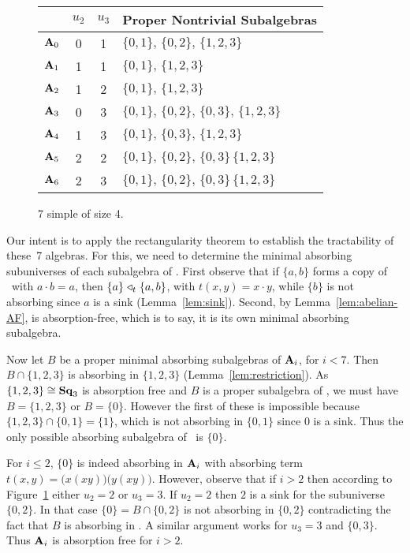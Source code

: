 \begin{figure}
\centering
\begin{tabular}{l|cc|l}
&$u_2$&$u_3$&Proper Nontrivial Subalgebras\\
\hline
$\mathbf{A}_0$&0&1&$\{0,1\},\, \{0,2\},\, \{1,2,3\}$\\
$\mathbf{A}_1$&1&1&$\{0,1\},\, \{1,2,3\}$\\
$\mathbf{A}_2$&1&2&$\{0,1\},\, \{1,2,3\}$\\
$\mathbf{A}_3$&0&3&$\{0,1\},\, \{0,2\},\, \{0,3\},\, \{1,2,3\}$\\
$\mathbf{A}_4$&1&3&$\{0,1\},\, \{0,3\},\, \{1,2,3\}$\\
$\mathbf{A}_5$&2&2&$\{0,1\},\, \{0,2\},\, \{0,3\}\, \{1,2,3\}$\\
$\mathbf{A}_6$&2&3&$\{0,1\},\, \{0,2\},\, \{0,3\}\, \{1,2,3\}$
\end{tabular}
 \caption{7 simple \cibs of size 4.}\label{fig:simple7}
 \end{figure}
 
Our intent is to apply the rectangularity theorem to establish the tractability of these~7 algebras. For this, we need to determine the minimal absorbing subuniverses of each subalgebra of \bA. First observe that if $\{a,b\}$ forms a copy of \slt\ with $a\cdot b =a$, then $\{a\} \mathrel{\triangleleft}_t \{a,b\}$, with $t(x,y)=x\cdot y$, while $\{b\}$ is not absorbing since $a$ is a sink (Lemma~\ref{lem:sink}). Second, by Lemma~\ref{lem:abelian-AF},  is absorption-free, which is to say, it is its own minimal absorbing subalgebra. 

 Now let $B$ be a proper minimal absorbing subalgebras of $\mathbf{A}_i$, for $i<7$. Then $B\cap \{1,2,3\}$ is absorbing in $\{1,2,3\}$ (Lemma~\ref{lem:restriction}). As $\{1,2,3\}\cong \mathbf{Sq}_{3}$ is absorption free and $B$ is a proper subalgebra of \bA, we must have $B=\{1,2,3\}$ or $B=\{0\}$. However the first of these is impossible because $\{1,2,3\} \cap \{0,1\} = \{1\}$, which is not absorbing in $\{0,1\}$ since $0$ is a sink. Thus the only possible absorbing subalgebra of \bA\ is $\{0\}$. 
 
 For $i\leq 2$, $\{0\}$ is indeed absorbing in $\mathbf{A}_i$ with absorbing term $t(x,y)=\bigl(x(xy)\bigr)\bigl(y(xy)\bigr)$. However, observe that if $i>2$ then according to Figure~\ref{fig:simple7} either $u_2=2$ or $u_3=3$. If $u_2=2$ then $2$ is a sink for the subuniverse $\{0,2\}$. In that case $\{0\}= B\cap \{0,2\}$ is not absorbing in $\{0,2\}$ contradicting the fact that $B$ is absorbing in \bA. A similar argument works for $u_3=3$ and $\{0,3\}$. Thus $\mathbf{A}_i$ is absorption free for $i>2$. 
 
